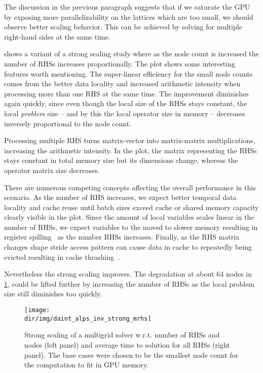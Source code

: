 The discussion in the previous paragraph suggests that if we saturate the GPU by exposing more parallelizability on the lattices which are too small, we should observe better scaling behavior.
This can be achieved by solving for multiple right-hand sides at the same time.

 shows a variant of a strong scaling study where as the node count is increased the number of RHSs increases proportionally.
The plot shows some interesting features worth mentioning.
The super-linear efficiency for the small node counts comes from the better data locality and increased arithmetic intensity when processing more than one RHS at the same time.
The improvement diminishes again quickly, since even though the local size of the RHSs stays constant, the local \emph{problem} size -- and by this the local operator size in memory -- decreases inversely proportional to the node count.

Processing multiple RHS turns matrix-vector into matrix-matrix multiplications, increasing the arithmetic intensity.
In the plot, the matrix representing the RHSs stays constant in total memory size but its dimensions change, whereas the operator matrix size decreases.

There are numerous competing concepts affecting the overall performance in this scenario.
As the number of RHS increases, we expect better temporal data locality and cache reuse until batch sizes exceed cache or shared memory capacity clearly visible in the plot.
Since the amount of local variables scales linear in the number of RHSs, we expect variables to the moved to slower memory resulting in register spilling~\cite{CHAITIN198147} as the number RHSs increases.
Finally, as the RHS matrix changes shape stride access pattern can cause data in cache to repeatedly being evicted resulting in cache thrashing~\cite{10.1145/1476589.1476705}.

Nevertheless the strong scaling improves.
The degradation at about \num{64} nodes in \cref{fig:daint:alps:inv:strong:mrhs}, could be lifted further by increasing the number of RHSs as the local problem size still diminishes too quickly.
\begin{figure}
\centering
\texttt{[image: \\dir/img/daint\_alps\_inv\_strong\_mrhs]}
\caption{
Strong scaling of a multigrid solver w.r.t. number of RHSs and nodes (left panel) and average time to solution for all RHSs (right panel).
The base cases were chosen to be the smallest node count for the computation to fit in GPU memory.
}
\label{fig:daint:alps:inv:strong:mrhs}
\end{figure}

